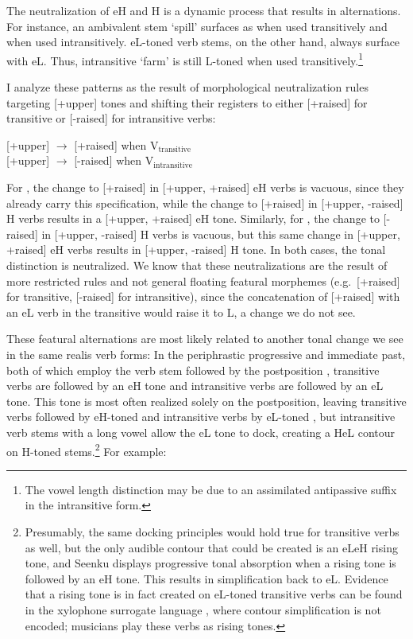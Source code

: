 \documentclass[output=paper]{langsci/langscibook}
\begin{document}
The neutralization of eH and H is a dynamic process that results in alternations. For instance, an ambivalent stem {\it {}} `spill' surfaces as {\it {}} when used transitively and {\it {}} when used intransitively. eL-toned verb stems, on the other hand, always surface with eL. Thus, intransitive {\it {}} `farm' is still L-toned {\it {}} when used transitively.\footnote{The vowel length distinction may be due to an assimilated antipassive suffix in the intransitive form.}

I analyze these patterns as the result of morphological neutralization rules targeting [+upper] tones and shifting their registers to either [+raised] for transitive or [-raised] for intransitive verbs:

\ea\label{ex:mcpherson:13} 
\ea\label{ex:mcpherson:13a} {[}+upper] $\rightarrow$ [+raised] when V$_{\text{transitive}}$ \\
\ex\label{ex:mcpherson:13b} {[}+upper] $\rightarrow$ [-raised] when V$_{\text{intransitive}}$ \\ 
\z
\z

For , the change to [+raised] in [+upper, +raised] eH verbs is vacuous, since they already carry this specification, while the change to [+raised] in [+upper, -raised] H verbs results in a [+upper, +raised] eH tone. Similarly, for , the change to [-raised] in [+upper, -raised] H verbs is vacuous, but this same change in [+upper, +raised] eH verbs results in [+upper, -raised] H tone. In both cases, the tonal distinction is neutralized. We know that these neutralizations are the result of more restricted rules and not general floating featural morphemes (e.g.\ [+raised] for transitive, [-raised] for intransitive), since the concatenation of [+raised] with an eL verb in the transitive would raise it to L, a change we do not see.

These featural alternations are most likely related to another tonal change we see in the same realis verb forms: In the periphrastic progressive and immediate past, both of which employ the verb stem followed by the postposition {\it {}}, transitive verbs are followed by an eH tone and intransitive verbs are followed by an eL tone. This tone is most often realized solely on the postposition, leaving transitive verbs followed by eH-toned {\it {}} and intransitive verbs by eL-toned {\it {}}, but intransitive verb stems with a long vowel allow the eL tone to dock, creating a HeL contour on H-toned stems.\footnote{Presumably, the same docking principles would hold true for transitive verbs as well, but the only audible contour that could be created is an eLeH rising tone, and Seenku displays progressive tonal absorption \citep{HymanSchuh74} when a rising tone is followed by an eH tone. This results in simplification back to eL. Evidence that a rising tone is in fact created on eL-toned transitive verbs can be found in the xylophone surrogate language \citep{McPherson16}, where contour simplification is not encoded; musicians play these verbs as rising tones.} For example:
\end{document}
